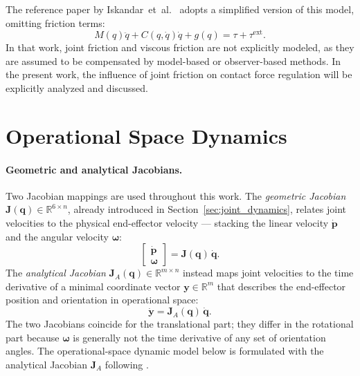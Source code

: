 \documentclass[
	german,%
	accentcolor=9c,%
	ruledheaders=section,%
	class=report,%
	thesis={type=bachelor},%
	fontsize=11pt,%
	parskip=half-,%
	custommargins=true,%
	marginpar=false,%
]{tudapub}
\begin{document}
The reference paper by Iskandar~et~al.~\cite{iskandar_hybrid_2023} adopts a simplified version of this model, omitting friction terms:
\begin{equation}
    M(q)\ddot{q} + C(q,\dot{q})\dot{q} + g(q) = \tau + \tau^{\text{ext}}.
    \label{eq:joint_dynamics_simple}
\end{equation}
In that work, joint friction and viscous friction are not explicitly modeled, as they are assumed to be compensated by model-based or observer-based methods. In the present work, the influence of joint friction on contact force regulation will be explicitly analyzed and discussed.

\section{Operational Space Dynamics}
\label{sec:operational_space}

\paragraph{Geometric and analytical Jacobians.}
Two Jacobian mappings are used throughout this work. The \emph{geometric
Jacobian} $\mathbf{J}(\mathbf{q}) \in \mathbb{R}^{6 \times n}$, already
introduced in Section~\ref{sec:joint_dynamics}, relates joint velocities
to the physical end-effector velocity — stacking the linear velocity
$\dot{\mathbf{p}}$ and the angular velocity $\boldsymbol{\omega}$:
%
\begin{equation}
    \begin{bmatrix}\dot{\mathbf{p}}\\\boldsymbol{\omega}\end{bmatrix}
    = \mathbf{J}(\mathbf{q})\,\dot{\mathbf{q}}.
    \label{eq:geom_jacobian}
\end{equation}
%
The \emph{analytical Jacobian} $\mathbf{J}_A(\mathbf{q}) \in \mathbb{R}^{m \times n}$
instead maps joint velocities to the time derivative of a minimal
coordinate vector $\mathbf{y} \in \mathbb{R}^{m}$ that describes the
end-effector position and orientation in operational space:
%
\begin{equation}
    \dot{\mathbf{y}} = \mathbf{J}_A(\mathbf{q})\,\dot{\mathbf{q}}.
    \label{eq:anal_jacobian}
\end{equation}
%
The two Jacobians coincide for the translational part; they differ in the
rotational part because $\boldsymbol{\omega}$ is generally not the time
derivative of any set of orientation angles. The operational-space dynamic model below is
formulated with the analytical Jacobian $\mathbf{J}_A$ following
\cite{Siciliano_Sciavicco_Villani_Oriolo_2009}.
\end{document}
